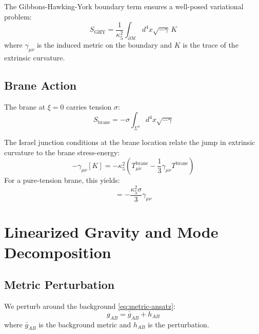 \documentclass[11pt,a4paper]{article}
\newcommand{\kfive}{\kappa_5}
\begin{document}
The Gibbons-Hawking-York boundary term ensures a well-posed variational problem:
\begin{equation}
S_{\mathrm{GHY}} = \frac{1}{\kfive^2} \int_{\partial\mathcal{M}} d^4x \sqrt{-\gamma}\, K
\label{eq:GHY}
\end{equation}
where $\gamma_{\mu\nu}$ is the induced metric on the boundary and $K$ is the
trace of the extrinsic curvature.

\subsection{Brane Action}

The brane at $\xi = 0$ carries tension $\sigma$:
\begin{equation}
S_{\mathrm{brane}} = -\sigma \int_{\Sigma^4} d^4x \sqrt{-\gamma}
\label{eq:brane-action}
\end{equation}

The Israel junction conditions at the brane location relate the jump in
extrinsic curvature to the brane stress-energy:
\begin{equation}
[K_{\mu\nu}] - \gamma_{\mu\nu}[K] = -\kfive^2 \left( T_{\mu\nu}^{\mathrm{brane}}
- \frac{1}{3}\gamma_{\mu\nu} T^{\mathrm{brane}} \right)
\label{eq:israel}
\end{equation}
For a pure-tension brane, this yields:
\begin{equation}
[K_{\mu\nu}] = -\frac{\kfive^2 \sigma}{3} \gamma_{\mu\nu}
\label{eq:israel-tension}
\end{equation}

\section{Linearized Gravity and Mode Decomposition}

\subsection{Metric Perturbation}

We perturb around the background \eqref{eq:metric-ansatz}:
\begin{equation}
g_{AB} = \bar{g}_{AB} + h_{AB}
\label{eq:metric-pert}
\end{equation}
where $\bar{g}_{AB}$ is the background metric and $h_{AB}$ is the perturbation.
\end{document}
